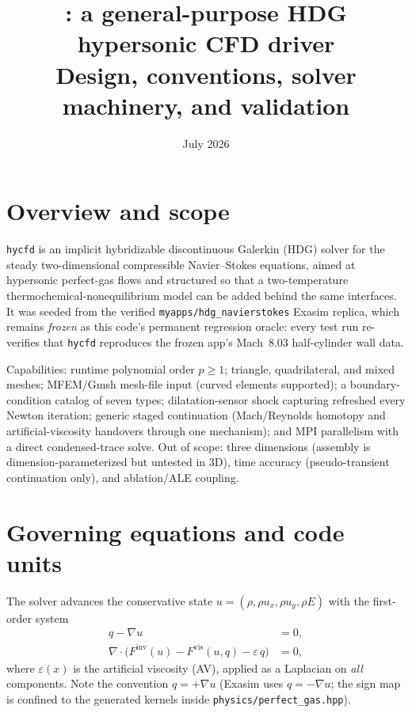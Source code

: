 \documentclass[11pt]{article}
\title{\code{hycfd}: a general-purpose HDG hypersonic CFD driver\\
       \large Design, conventions, solver machinery, and validation}
\author{\code{myapps/hypersonic\_cfd}}
\date{July 2026}
\newcommand{\code}[1]{\texttt{#1}}
\begin{document}
\maketitle

\section{Overview and scope}

\code{hycfd} is an implicit hybridizable discontinuous Galerkin (HDG)
solver for the steady two-dimensional compressible Navier--Stokes
equations, aimed at hypersonic perfect-gas flows and structured so that
a two-temperature thermochemical-nonequilibrium model can be added
behind the same interfaces. It was seeded from the verified
\code{myapps/hdg\_navierstokes} Exasim replica, which remains
\emph{frozen} as this code's permanent regression oracle: every test
run re-verifies that \code{hycfd} reproduces the frozen app's Mach~8.03
half-cylinder wall data.

Capabilities: runtime polynomial order $p \ge 1$; triangle, quadrilateral,
and mixed meshes; MFEM/Gmsh mesh-file input (curved elements supported);
a boundary-condition catalog of seven types; dilatation-sensor shock
capturing refreshed every Newton iteration; generic staged continuation
(Mach/Reynolds homotopy and artificial-viscosity handovers through one
mechanism); and MPI parallelism with a direct condensed-trace solve.
Out of scope: three dimensions (assembly is dimension-parameterized but
untested in 3D), time accuracy (pseudo-transient continuation only),
and ablation/ALE coupling.

\section{Governing equations and code units}

The solver advances the conservative state $u = (\rho, \rho u_x,
\rho u_y, \rho E)$ with the first-order system
\begin{align}
  q - \nabla u &= 0, \\
  \nabla \cdot \bigl(F^{\mathrm{inv}}(u) - F^{\mathrm{vis}}(u, q)
      - \varepsilon\, q\bigr) &= 0,
\end{align}
where $\varepsilon(x)$ is the artificial viscosity (AV), applied as a
Laplacian on \emph{all} components. Note the convention $q = +\nabla u$
(Exasim uses $q = -\nabla u$; the sign map is confined to the generated
kernels inside \code{physics/perfect\_gas.hpp}).
\end{document}
